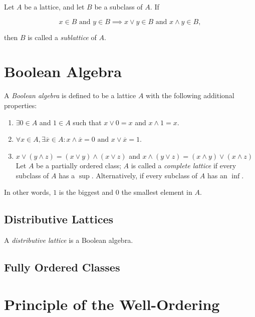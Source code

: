 Let \(A\) be a lattice, and let \(B\) be a subclass of \(A\). If

\[
	x \in B \text{ and } y \in B \implies x \lor y \in B \text{ and } x \land y \in B,
\]

then \(B\) is called a \emph{sublattice} of \(A\).

\section{Boolean Algebra}

A \emph{Boolean algebra} is defined to be a lattice \(A\) with the following additional properties:

\begin{enumerate}

	\item \(\exists 0 \in A\) and \(1 \in A\) such that \(x \lor 0 = x\) and \(x \land 1 = x\).

	\item \(\forall x \in A, \exists \overline{x} \in A: x \land \overline{x} = 0 \text{ and } x \lor \overline{x} = 1\).

	\item \(x \lor (y \land z) = (x \lor y) \land (x \lor z)\) and \(x \land ( y \lor z) = (x \land y) \lor (x \land z)\)
	      Let \(A\) be a partially ordered class; \(A\) is called a \emph{complete lattice} if every subclass of \(A\) has a \(\sup\).
	      Alternatively, if every subclass of \(A\) has an \(\inf\).

\end{enumerate}

In other words, \(1\) is the biggest and \(0\) the smallest element in \(A\).

\subsection{Distributive Lattices}

A \emph{distributive lattice} is a Boolean algebra.

\subsection{Fully Ordered Classes}


\section{Principle of the Well-Ordering}

